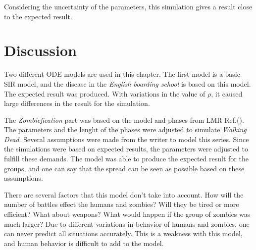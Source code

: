 \documentclass[%
twoside,                 %
final,                   %
chapterprefix=true,      %
open=right               %
10pt]{book}
\begin{document}
\noindent
Considering the uncertainty of the parameters, this simulation gives a result close to the expected result. 


\vspace{3mm}




\vspace{3mm}



\section{Discussion}
Two different ODE models are used in this chapter. The first model is a basic SIR model, and the disease in the \emph{English boarding school} is based on this model. The expected result was produced. With variations in the value of $\rho$, it caused large differences in the result for the simulation.


\vspace{3mm}




\vspace{3mm}


The \emph{Zombiefication} part was based on the model and phases from LMR Ref.(\cite{zombie-math}). The parameters and the lenght of the phases were adjusted to simulate \emph{Walking Dead}. Several assumptions were made from the writer to model this series. Since the simulations were based on expected results, the parameters were adjusted to fulfill these demands. The model was able to produce the expected result for the groups, and one can say that the spread can be seen as possible based on these assumptions.    


\vspace{3mm}




\vspace{3mm}


There are several factors that this model don't take into account. How will the number of battles effect the humans and zombies? Will they be tired or more efficient? What about weapons? What would happen if the group of zombies was much larger? Due to different variations in behavior of humans and zombies, one can never predict all situations accurately. This is a weakness with this model, and human behavior is difficult to add to the model.  


\vspace{3mm}
\end{document}
